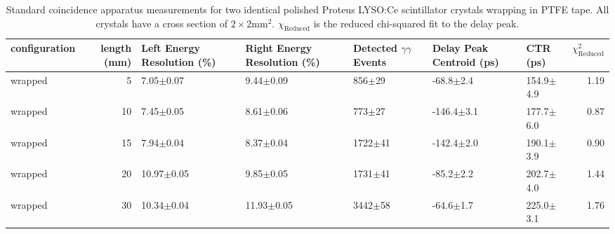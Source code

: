 \begin{table}
\caption{\label{tab:standardctr} Standard coincidence apparatus measurements for two identical polished Proteus LYSO:Ce scintillator crystals wrapping in PTFE tape. All crystals have a cross section of $2\times2$mm$^2$. $\chi_\text{Reduced}$ is the reduced chi-squared fit to the delay peak.}
\begin{tabular}{lrlllllr}
configuration &  length (mm) & Left Energy Resolution (\%) & Right Energy Resolution (\%) & Detected $\gamma\gamma$ Events & Delay Peak Centroid (ps) & CTR (ps) &  $\chi^2_\text{Reduced}$ \\
\hline
      wrapped &       5 &        7.05$\pm$0.07 &    9.44$\pm$0.09 &   856$\pm$29 &   -68.8$\pm$2.4 &  154.9$\pm$4.9 &        1.19 \\
      wrapped &      10 &        7.45$\pm$0.05 &    8.61$\pm$0.06 &   773$\pm$27 &  -146.4$\pm$3.1 &  177.7$\pm$6.0 &        0.87 \\
      wrapped &      15 &        7.94$\pm$0.04 &    8.37$\pm$0.04 &  1722$\pm$41 &  -142.4$\pm$2.0 &  190.1$\pm$3.9 &        0.90 \\
      wrapped &      20 &       10.97$\pm$0.05 &    9.85$\pm$0.05 &  1731$\pm$41 &   -85.2$\pm$2.2 &  202.7$\pm$4.0 &        1.44 \\
      wrapped &      30 &       10.34$\pm$0.04 &   11.93$\pm$0.05 &  3442$\pm$58 &   -64.6$\pm$1.7 &  225.0$\pm$3.1 &        1.76 \\
\hline
\end{tabular}
\end{table}
